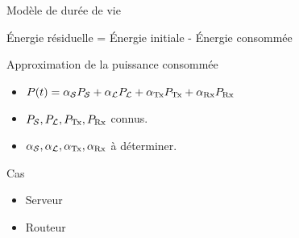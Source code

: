 \begin{frame}{Modèle de durée de vie}

      
    Énergie résiduelle = Énergie initiale - Énergie consommée

  \begin{block}{Approximation de la puissance consommée}
    \begin{itemize}
      \item $P(t) = \alpha_{\mathcal{S}} P_{\mathcal{S}} + \alpha_{\mathcal{L}} P_{\mathcal{L}} + \alpha_{\textrm{Tx}} P_{\textrm{Tx}} + \alpha_{\textrm{Rx}} P_{\textrm{Rx}}$
      \item $P_{\mathcal{S}}, P_{\mathcal{L}}, P_{\textrm{Tx}}, P_{\textrm{Rx}}$ connus.
      \item $\alpha_{\mathcal{S}}, \alpha_{\mathcal{L}}, \alpha_{\textrm{Tx}}, \alpha_{\textrm{Rx}}$ à déterminer.
    \end{itemize}
  \end{block}

  \begin{block}{Cas}
    \begin{itemize}
      \item Serveur
      \item Routeur
    \end{itemize}
  \end{block}

\end{frame}




